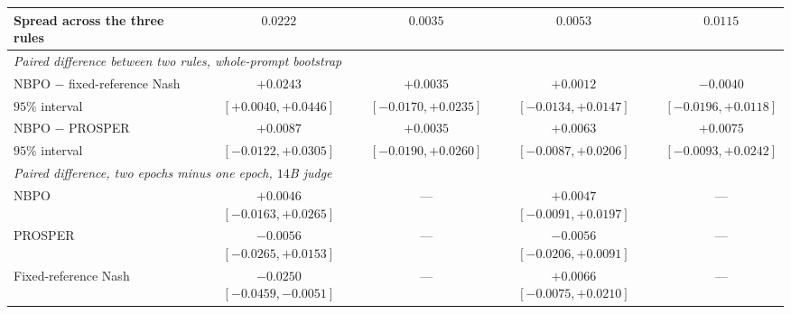 \documentclass{article}
\theoremstyle{remark}
\theoremstyle{plain}
\begin{document}
\begin{table}[H]
\begin{tabular}{lcccc}
Spread across the three rules & $0.0222$ & $\mathbf{0.0035}$ & $0.0053$ & $0.0115$\\
\midrule
\multicolumn{5}{l}{\emph{Paired difference between two rules, whole-prompt bootstrap}}\\
NBPO $-$ fixed-reference Nash & $\mathbf{+0.0243}$ & $+0.0035$ & $+0.0012$ & $-0.0040$\\
\quad $95\%$ interval & \tiny{$[+0.0040,+0.0446]$} & \tiny{$[-0.0170,+0.0235]$} & \tiny{$[-0.0134,+0.0147]$} & \tiny{$[-0.0196,+0.0118]$}\\
NBPO $-$ PROSPER & $+0.0087$ & $+0.0035$ & $+0.0063$ & $+0.0075$\\
\quad $95\%$ interval & \tiny{$[-0.0122,+0.0305]$} & \tiny{$[-0.0190,+0.0260]$} & \tiny{$[-0.0087,+0.0206]$} & \tiny{$[-0.0093,+0.0242]$}\\
\midrule
\multicolumn{5}{l}{\emph{Paired difference, two epochs minus one epoch, $14$B judge}}\\
NBPO & $+0.0046$ \tiny{$[-0.0163,+0.0265]$} & --- & $+0.0047$ \tiny{$[-0.0091,+0.0197]$} & ---\\
PROSPER & $-0.0056$ \tiny{$[-0.0265,+0.0153]$} & --- & $-0.0056$ \tiny{$[-0.0206,+0.0091]$} & ---\\
Fixed-reference Nash & $-0.0250$ \tiny{$[-0.0459,-0.0051]$} & --- & $+0.0066$ \tiny{$[-0.0075,+0.0210]$} & ---\\
\bottomrule
\end{tabular}
\end{table}
\end{document}
